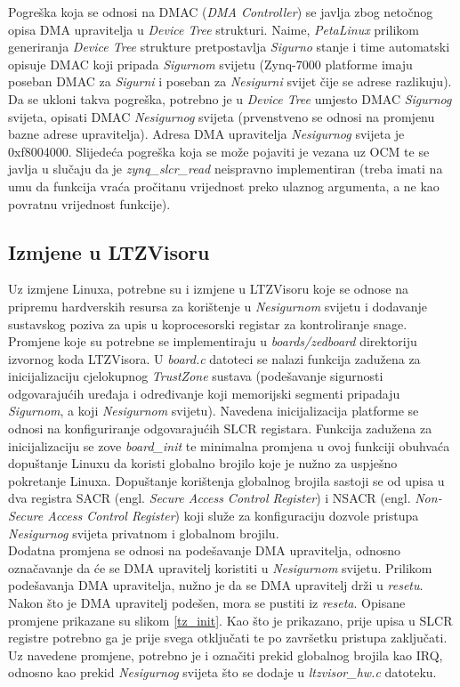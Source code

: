 \documentclass[times, utf8, diplomski, numeric]{fer}
\begin{document}
Pogreška koja se odnosi na DMAC (\textit{DMA Controller}) se javlja zbog netočnog opisa DMA upravitelja u \textit{Device
Tree} strukturi. Naime, \textit{PetaLinux} prilikom generiranja \textit{Device Tree} strukture pretpostavlja \textit{Sigurno} stanje i
time automatski opisuje DMAC koji pripada \textit{Sigurnom} svijetu (Zynq-7000 platforme imaju poseban DMAC za \textit{Sigurni} i poseban za
\textit{Nesigurni} svijet čije se adrese razlikuju). Da se ukloni takva pogreška, potrebno je u \textit{Device Tree} umjesto DMAC
\textit{Sigurnog} svijeta, opisati DMAC \textit{Nesigurnog} svijeta (prvenstveno se odnosi na promjenu bazne adrese upravitelja).
Adresa DMA upravitelja \textit{Nesigurnog} svijeta je 0xf8004000.
Slijedeća pogreška koja se može pojaviti je vezana uz OCM te se javlja u slučaju da je \textit{zynq\_slcr\_read} neispravno
implementiran (treba imati na umu da funkcija vraća pročitanu vrijednost preko ulaznog argumenta, a ne kao povratnu vrijednost
funkcije).

\subsection{Izmjene u LTZVisoru}
Uz izmjene Linuxa, potrebne su i izmjene u LTZVisoru koje se odnose na pripremu hardverskih resursa za korištenje u \textit{Nesigurnom}
svijetu i dodavanje sustavskog poziva za upis u koprocesorski registar za kontroliranje snage. Promjene koje su potrebne se
implementiraju u \textit{boards/zedboard} direktoriju izvornog koda LTZVisora. U \textit{board.c} datoteci se nalazi funkcija
zadužena za inicijalizaciju cjelokupnog \textit{TrustZone} sustava (podešavanje sigurnosti odgovarajućih uređaja i određivanje
koji memorijski segmenti pripadaju \textit{Sigurnom}, a koji \textit{Nesigurnom} svijetu). Navedena inicijalizacija platforme se odnosi na
konfiguriranje odgovarajućih SLCR registara. Funkcija zadužena za inicijalizaciju se zove \textit{board\_init} te minimalna
promjena u ovoj funkciji obuhvaća dopuštanje Linuxu da koristi globalno brojilo koje je nužno za uspješno pokretanje Linuxa.
Dopuštanje korištenja globalnog brojila sastoji se od upisa u dva registra SACR (engl. \textit{Secure Access Control Register})
i NSACR (engl. \textit{Non-Secure Access Control Register}) koji služe za konfiguraciju dozvole pristupa \textit{Nesigurnog} svijeta
privatnom i globalnom brojilu.\\
Dodatna promjena se odnosi na podešavanje DMA upravitelja, odnosno označavanje da će se DMA upravitelj koristiti u \textit{Nesigurnom}
svijetu. Prilikom podešavanja DMA upravitelja, nužno je da se DMA upravitelj drži u \textit{resetu}. Nakon što je DMA upravitelj
podešen, mora se pustiti iz \textit{reseta}. Opisane promjene prikazane su slikom \ref{tz_init}.
Kao što je prikazano, prije upisa u SLCR registre potrebno ga je prije svega otključati te po završetku pristupa zaključati.
Uz navedene promjene, potrebno je i označiti prekid globalnog brojila kao IRQ, odnosno kao prekid \textit{Nesigurnog} svijeta
što se dodaje u \textit{ltzvisor\_hw.c} datoteku.
\end{document}
